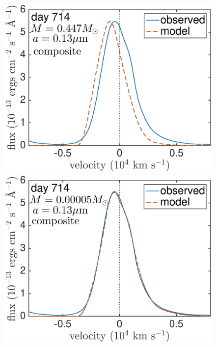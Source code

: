 \begin{figure}
\centering
\includegraphics[trim =-30 30 50 0,clip=true,scale=0.35]{chapters/chapter5/images/silicates_take2/composite_Dwek_Ha2.eps}
\hspace{3mm}
\includegraphics[trim =18 30 0 -10,clip=true,scale=0.35]{chapters/chapter5/images/silicates_take2/composite_bestfit_Ha2.eps}


\end{figure}
